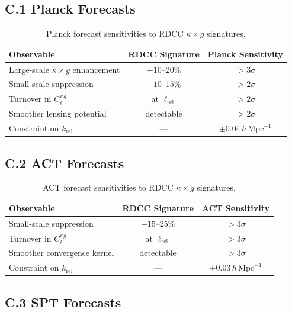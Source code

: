 \documentclass[11pt,a4paper]{article}
\begin{document}
\subsection*{C.1 Planck Forecasts}

\begin{table}[H]
\centering
\begin{tabular}{lcc}
\hline
\textbf{Observable} & \textbf{RDCC Signature} & \textbf{Planck Sensitivity} \\
\hline
Large-scale $\kappa \times g$ enhancement & $+10$--$20\%$ & $>3\sigma$ \\
Small-scale suppression & $-10$--$15\%$ & $>2\sigma$ \\
Turnover in $C_{\ell}^{\kappa g}$ & at $\ell_{\mathrm{rel}}$ & $>2\sigma$ \\
Smoother lensing potential & detectable & $>2\sigma$ \\
Constraint on $k_{\mathrm{rel}}$ & --- & $\pm 0.04\,h\,\mathrm{Mpc}^{-1}$ \\
\hline
\end{tabular}
\caption{Planck forecast sensitivities to RDCC $\kappa \times g$ signatures.}
\end{table}

\subsection*{C.2 ACT Forecasts}

\begin{table}[H]
\centering
\begin{tabular}{lcc}
\hline
\textbf{Observable} & \textbf{RDCC Signature} & \textbf{ACT Sensitivity} \\
\hline
Small-scale suppression & $-15$--$25\%$ & $>3\sigma$ \\
Turnover in $C_{\ell}^{\kappa g}$ & at $\ell_{\mathrm{rel}}$ & $>3\sigma$ \\
Smoother convergence kernel & detectable & $>3\sigma$ \\
Constraint on $k_{\mathrm{rel}}$ & --- & $\pm 0.03\,h\,\mathrm{Mpc}^{-1}$ \\
\hline
\end{tabular}
\caption{ACT forecast sensitivities to RDCC $\kappa \times g$ signatures.}
\end{table}

\subsection*{C.3 SPT Forecasts}
\end{document}
